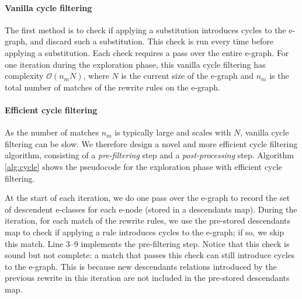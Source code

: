 \documentclass{article}
\begin{document}
\paragraph{Vanilla cycle filtering}
The first method is to check if applying a substitution introduces cycles to the e-graph, and discard such a substitution.
This check is run every time before applying a substitution. 
Each check requires a pass over the entire e-graph. 
For one iteration during the exploration phase, this vanilla cycle filtering has complexity $\mathcal{O}(n_m N)$, where $N$ is the current size of the e-graph and $n_m$ is the total number of matches of the rewrite rules on the e-graph.

\paragraph{Efficient cycle filtering}

As the number of matches $n_m$ is typically large and scales with $N$, vanilla cycle filtering can be slow. 
We therefore design a novel and more efficient cycle filtering algorithm, consisting of a \textit{pre-filtering} step and a \textit{post-processing} step.
Algorithm \ref{alg:cycle} shows the pseudocode for the exploration phase with efficient cycle filtering. 

At the start of each iteration, we do one pass over the e-graph to record the set of descendent e-classes for each e-node (stored in a descendants map). 
During the iteration, for each match of the rewrite rules, we use the pre-stored descendants map to check if applying a rule introduces cycles to the e-graph; if so, we skip this match.
Line 3--9 implements the pre-filtering step.
Notice that this check is sound but not complete: a match that passes this check can still introduce cycles to the e-graph. 
This is because new descendants relations introduced by the previous rewrite in this iteration are not included in the pre-stored descendants map.
\end{document}
